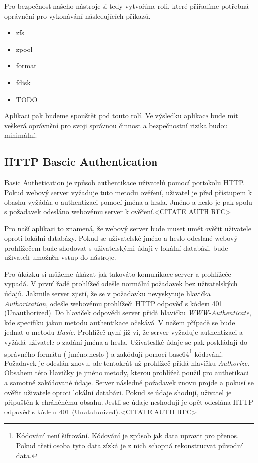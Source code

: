     Pro bezpečnost našeho nástroje si tedy vytvoříme roli, které přiřadíme potřebná oprávnění pro vykonávání následujících příkazů.
    \begin{itemize}
      \item zfs
      \item zpool
      \item format
      \item fdisk
      \item TODO
    \end{itemize}
    
    Aplikaci pak budeme spouštět pod touto rolí. Ve výsledku aplikace bude mít veškerá oprávnění pro svoji správnou činnost a bezpečnostní rizika budou minimální.    
    \subsection{HTTP Bascic Authentication}
    \label{httpauth}
    Basic Authetication je způsob authentikace uživatelů pomocí portokolu HTTP. Pokud webový server vyžaduje tuto metodu ověření, uživatel je před přístupem k obashu vyžádán o authentizaci pomocí jména a hesla. Jméno a heslo je pak spolu s požadavek odesláno webovému server k ověření.<CITATE AUTH RFC>
    
    Pro naší aplikaci to znamená, že webový server bude muset umět ověřit uživatele oproti lokální databázy. Pokud se uživatelské jméno a heslo odeslané webový prohlížečem bude shodovat s uživatelskými údaji v lokální databázi, bude uživateli umožněn vstup do nástroje.
    
    Pro úkázku si můžeme úkázat jak takováto komunikace server a prohlížeče vypadá. V první řadě prohlížeč odešle normální požadavek bez uživatelských údajů. Jakmile server zjistí, že se v požadavku nevyskytuje hlavička \emph{Authorization}, odešle webovému prohlížeči HTTP odpověď s kódem 401 (Unauthorized). Do hlaviček odpovědi server přidá hlavičku \emph{WWW-Authenticate}, kde specifiku jakou metodu authentikace očekává. V našem případě se bude jednat o metodu \emph{Basic}. Prohlížeč nyní již ví, že server vyžaduje authentizaci a vyžádá uživatele o zadání jména a hesla. Uživateslké údaje se pak poskládají do správného formátu ( jméno:heslo ) a zakódují pomocí base64\footnote{Kódování není šifrování. Kódování je způsob jak data upravit pro přenos. Pokud třetí osoba tyto data zízká je z nich schopná rekonstruovat původní data.} kódování. Požadavek je odeslán znovu, ale tentokrát už prohlížeč přidá hlavičku \emph{Authorize}. Obsahem této hlavičky je jméno metody, kterou prohlížeč použil pro authetikaci a samotné zakódované údaje. Server následně požadavek znovu projde a pokusí se ověřit uživatele oproti lokální databázi. Pokud se údaje shodují, uživatel je připuštěn k chráněnému obsahu. Jestli se údaje neshodují je opět odeslána HTTP odpověď s kódem 401 (Unatuhorized).<CITATE AUTH RFC>
    
